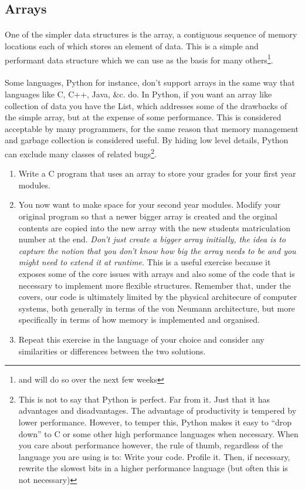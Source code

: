 \documentclass[10pt, a4paper, twosize]{article}
\begin{document}
\subsection{Arrays}
\paragraph{} One of the simpler data structures is the array, a contiguous sequence of memory locations each of which stores an element of data. This is a simple and performant data structure which we can use as the basis for many others\footnote{and will do so over the next few weeks}.

\paragraph{} Some languages, Python for instance, don't support arrays in the same way that languages like C, C++, Java, \&c. do. In Python, if you want an array like collection of data you have the List, which addresses some of the drawbacks of the simple array, but at the expense of some performance. This is considered acceptable by many programmers, for the same reason that memory management and garbage collection is considered useful. By hiding low level details, Python can exclude many classes of related bugs\footnote{This is not to say that Python is perfect. Far from it. Just that it has advantages and disadvantages. The advantage of productivity is tempered by lower performance. However, to temper this, Python makes it easy to ``drop down'' to C or some other high performance languages when necessary. When you care about performance however, the rule of thumb, regardless of the language you are using is to: Write your code. Profile it. Then, if necessary, rewrite the slowest bits in a higher performance language (but often this is not necessary)}.

\begin{enumerate}
\item Write a C program that uses an array to store your grades for your first year modules. 
\item You now want to make space for your second year modules. Modify your original program so that a newer bigger array is created and the orginal contents are copied into the new array with the new students matriculation number at the end. \emph{Don't just create a bigger array initially, the idea is to capture the notion that you don't know how big the array needs to be and you might need to extend it at runtime}. This is a useful exercise because it exposes some of the core issues with arrays and also some of the code that is necessary to implement more flexible structures. Remember that, under the covers, our code is ultimately limited by the physical architecure of computer systems, both generally in terms of the von Neumann architecture, but more specifically in terms of how memory is implemented and organised.
\item Repeat this exercise in the language of your choice and consider any similarities or differences between the two solutions.
\end{enumerate}
\end{document}
